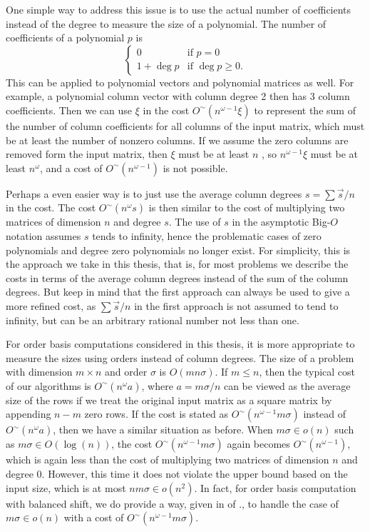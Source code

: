 One simple way to address this issue is to use the actual number of
coefficients instead of the degree to measure the size of a polynomial.
The number of coefficients of a polynomial $p$ is 
\[
\begin{cases}
0 & \mbox{if }p=0\\
1+\deg p & \mbox{if }\deg p\ge0.
\end{cases}
\]
This can be applied to polynomial vectors and polynomial matrices
as well. For example, a polynomial column vector with column degree
2 then has 3 column coefficients. Then we can use $\xi$ in the cost
$O^{\sim}\left(n^{\omega-1}\xi\right)$ to represent the sum of the
number of column coefficients for all columns of the input matrix,
which must be at least the number of nonzero columns. If we assume
the zero columns are removed form the input matrix, then $\xi$ must
be at least $n$ , so $n^{\omega-1}\xi$ must be at least $n^{\omega}$,
and a cost of $O^{\sim}\left(n^{\omega-1}\right)$ is not possible.

Perhaps a even easier way is to just use the average column degrees
$s=\sum\vec{s}/n$ in the cost. The cost $O^{\sim}(n^{\omega}s)$
is then similar to the cost of multiplying two matrices of dimension
$n$ and degree $s$. The use of $s$ in the asymptotic Big-$O$ notation
assumes $s$ tends to infinity, hence the problematic cases of zero
polynomials and degree zero polynomials no longer exist. For simplicity,
this is the approach we take in this thesis, that is, for most problems
we describe the costs in terms of the average column degrees instead
of the sum of the column degrees. But keep in mind that the first
approach can always be used to give a more refined cost, as $\sum\vec{s}/n$
in the first approach is not assumed to tend to infinity, but can
be an arbitrary rational number not less than one.

For order basis computations considered in this thesis, it is more
appropriate to measure the sizes using orders instead of column degrees.
The size of a problem with dimension $m\times n$ and order $\sigma$
is $O\left(mn\sigma\right)$. If $m\le n$, then the typical cost
of our algorithms is $O^{\sim}\left(n^{\omega}a\right)$, where $a=m\sigma/n$
can be viewed as the average size of the rows if we treat the original
input matrix as a square matrix by appending $n-m$ zero rows. If
the cost is stated as $O^{\sim}\left(n^{\omega-1}m\sigma\right)$
instead of $O^{\sim}\left(n^{\omega}a\right)$, then we have a similar
situation as before. When $m\sigma\in o\left(n\right)$ such as $m\sigma\in O\left(\log\left(n\right)\right)$,
the cost $O^{\sim}\left(n^{\omega-1}m\sigma\right)$ again becomes
$O^{\sim}\left(n^{\omega-1}\right)$, which is again less than the
cost of multiplying two matrices of dimension $n$ and degree 0. However,
this time it does not violate the upper bound based on the input size,
which is at most $nm\sigma\in o(n^{2})$. In fact, for order basis
computation with balanced shift, we do provide a way, given in 
of ., to handle the case of $m\sigma\in o\left(n\right)$
with a cost of $O^{\sim}\left(n^{\omega-1}m\sigma\right)$.


